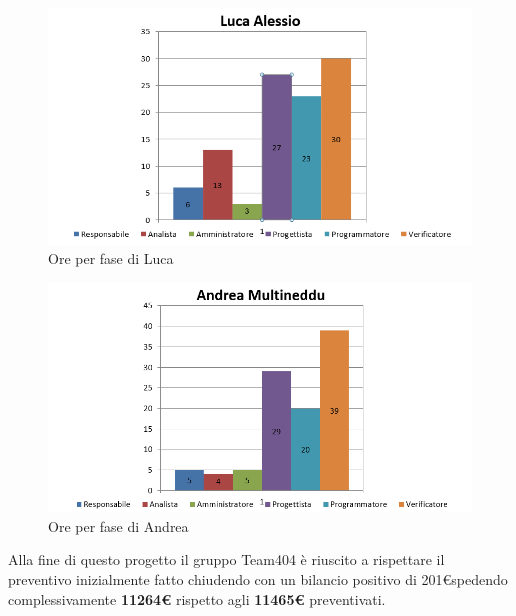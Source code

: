 \documentclass[a4paper,11pt]{article}
\begin{document}
	\begin{figure}[h!]
		\centering
		\includegraphics[scale=0.7]{../Images/ore_per_ruolo_Luca.png}
	\caption{ Ore per fase di Luca}
	\end{figure}
	
	\begin{figure}[h!]
		\centering
		\includegraphics[scale=0.7]{../Images/ore_per_ruolo_Andrea.png}
	\caption{ Ore per fase di Andrea}
	\end{figure}
	\newpage
	\newpage
	Alla fine di questo progetto il gruppo Team404 è riuscito a rispettare il  preventivo inizialmente fatto chiudendo con un bilancio positivo di 201\euro  spedendo complessivamente \textbf{11264\euro} rispetto agli \textbf{11465\euro} preventivati. \\
	
	
	
\end{document}
